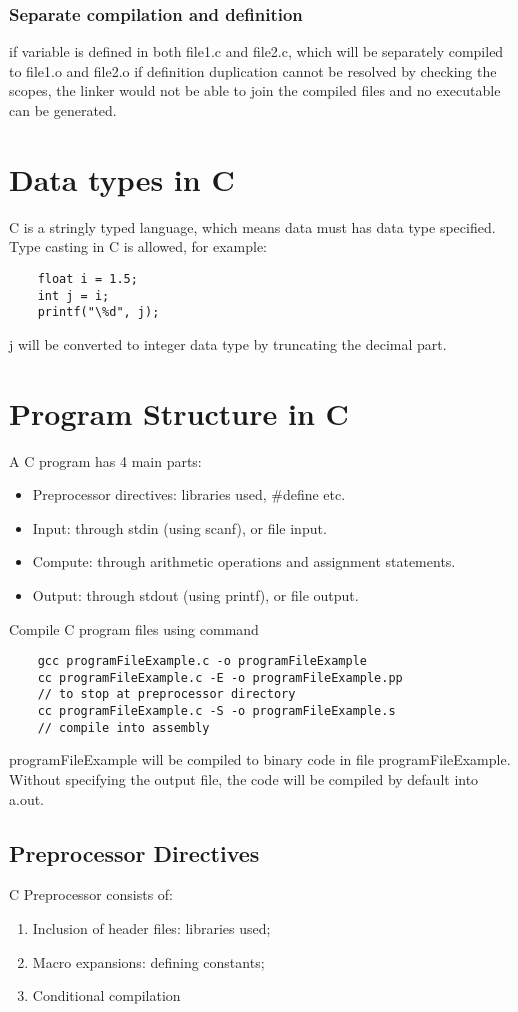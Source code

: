 \documentclass[12pt]{article} %
\begin{document}
\subsubsection*{Separate compilation and definition}
if variable is defined in both file1.c and file2.c, which will be separately compiled to file1.o and file2.o
if definition duplication cannot be resolved by checking the scopes, the linker would not be able to join the compiled files and no executable can be generated.
\section {Data types in C}
C is a stringly typed language, which means data must has data type specified.
Type casting in C is allowed, for example:
\begin{lstlisting}
    float i = 1.5;
    int j = i;
    printf("\%d", j);
\end{lstlisting}

j will be converted to integer data type by truncating the decimal part.

\section{Program Structure in C}
A C program has 4 main parts:
\begin{itemize}
    \item Preprocessor directives: libraries used, \#define etc.
    \item Input: through stdin (using scanf), or file input.
    \item Compute: through arithmetic operations and assignment statements.
    \item Output: through stdout (using printf), or file output.
\end{itemize}
Compile C program files using command
\begin{lstlisting}
    gcc programFileExample.c -o programFileExample
    cc programFileExample.c -E -o programFileExample.pp 
    // to stop at preprocessor directory
    cc programFileExample.c -S -o programFileExample.s
    // compile into assembly
\end{lstlisting}
programFileExample will be compiled to binary code in file programFileExample.
Without specifying the output file, the code will be compiled by default into a.out.
\subsection{Preprocessor Directives}
C Preprocessor consists of: 
\begin{enumerate}
    \item Inclusion of header files: libraries used;
    \item Macro expansions: defining constants;
    \item Conditional compilation
\end{enumerate}
\end{document}
